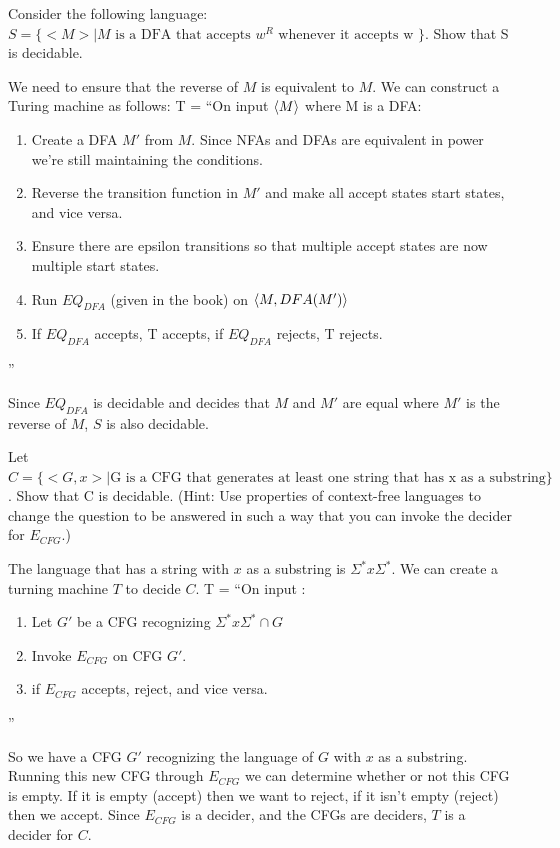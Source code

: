 \begin{problem}{3}
  Consider the following language: $S = \{<M> | M \text{ is a DFA that accepts } w^R \text{ whenever it accepts w }\}$. Show that S is
  decidable.
  \begin{solution}
    We need to ensure that the reverse of $M$ is equivalent to $M$. We can construct a Turing machine as follows:
    T = ``On input $\left \langle M \right \rangle $ where M is a DFA:
    \begin{enumerate}
      \item Create a DFA $M'$ from $M$. Since NFAs and DFAs are equivalent in power we're still maintaining the conditions.\\
      \item Reverse the transition function in $M'$ and make all accept states start states, and vice versa.\\
      \item Ensure there are epsilon transitions so that multiple accept states are now multiple start states.\\
      \item Run $EQ_{DFA}$ (given in the book) on $\left \langle M, DFA(M') \right \rangle $\\
      \item If $EQ_{DFA}$ accepts, T accepts, if $EQ_{DFA}$ rejects, T rejects.\\
    \end{enumerate}
    ''

    \noindent Since $EQ_{DFA}$ is decidable and decides that $M$ and $M'$ are equal where $M'$ is the reverse of $M$, $S$ is also
    decidable.
  \end{solution}
\end{problem}

\begin{problem}{4}
  Let $C = \{<G,x> | \text{G is a CFG that generates at least one string that has x as a substring}\}$. Show that C is decidable.
  (Hint: Use properties of context-free languages to change the question to be answered in such a way that you can
  invoke the decider for $E_{CFG}$.)
  \begin{solution}
    The language that has a string with $x$ as a substring is $\Sigma^*x\Sigma^*$.
    We can create a turning machine $T$ to decide $C$.
    T = ``On input :
    \begin{enumerate}
      \item Let $G'$ be a CFG recognizing $\Sigma^*x\Sigma^* \cap G$\\
      \item Invoke $E_{CFG}$ on CFG $G'$.\\
      \item if $E_{CFG}$ accepts, reject, and vice versa.
    \end{enumerate}
    ''
  \end{solution}
  So we have a CFG $G'$ recognizing the language of $G$ with $x$ as a substring. Running this new CFG through $E_{CFG}$ we
  can determine whether or not this CFG is empty. If it is empty (accept) then we want to reject, if it isn't empty
  (reject) then we accept.  Since $E_{CFG}$ is a decider, and the CFGs are deciders, $T$ is a decider for $C$.
\end{problem}

